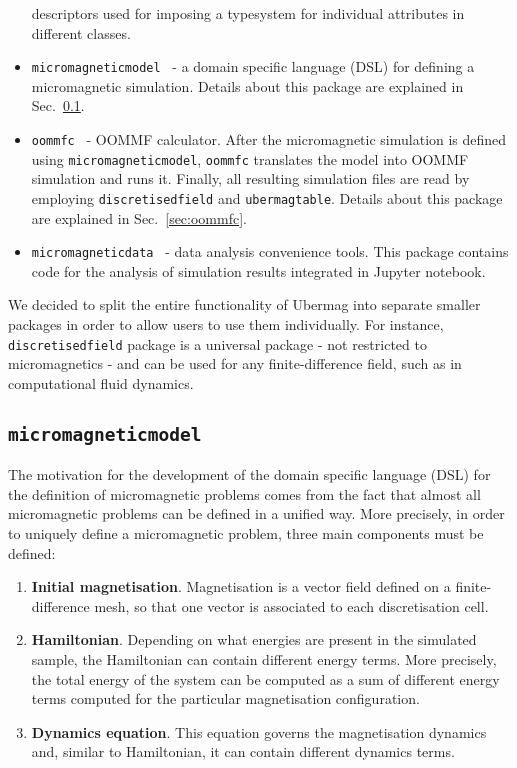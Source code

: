 \documentclass{deliverablereport}
\begin{document}
\begin{itemize}
descriptors used for imposing a typesystem for individual attributes
in different classes.
\item \texttt{micromagneticmodel}~\cite{micromagneticmodel} - a domain
  specific language (DSL) for defining a micromagnetic
  simulation. Details about this package are explained in
  Sec.~\ref{sec:micromagneticmodel}.
\item \texttt{oommfc}~\cite{oommfc} - OOMMF calculator. After the
  micromagnetic simulation is defined using
  \texttt{micromagneticmodel}, \texttt{oommfc} translates the model
  into OOMMF simulation and runs it. Finally, all resulting simulation
  files are read by employing \texttt{discretisedfield} and
  \texttt{ubermagtable}. Details about this package are explained in
  Sec.~\ref{sec:oommfc}.
\item \texttt{micromagneticdata}~\cite{micromagneticdata} - data
  analysis convenience tools. This package contains code for the
  analysis of simulation results integrated in Jupyter notebook.
\end{itemize}

We decided to split the entire functionality of Ubermag into separate
smaller packages in order to allow users to use them individually. For
instance, \texttt{discretisedfield} package is a universal package -
not restricted to micromagnetics - and can be used for any
finite-difference field, such as in computational fluid dynamics.

\subsection{\texttt{micromagneticmodel}}\label{sec:micromagneticmodel}

The motivation for the development of the domain specific language
(DSL) for the definition of micromagnetic problems comes from the fact
that almost all micromagnetic problems can be defined in a unified
way. More precisely, in order to uniquely define a micromagnetic
problem, three main components must be defined:

\begin{enumerate}
\item \textbf{Initial magnetisation}. Magnetisation is a vector
field defined on a finite-difference mesh, so that one vector is
associated to each discretisation cell.
\item \textbf{Hamiltonian}. Depending on what energies are present in
the simulated sample, the Hamiltonian can contain different energy
terms. More precisely, the total energy of the system can be computed
as a sum of different energy terms computed for the particular
magnetisation configuration.
\item \textbf{Dynamics equation}. This equation governs the
magnetisation dynamics and, similar to Hamiltonian, it can contain
different dynamics terms.
\end{enumerate}
\end{document}
